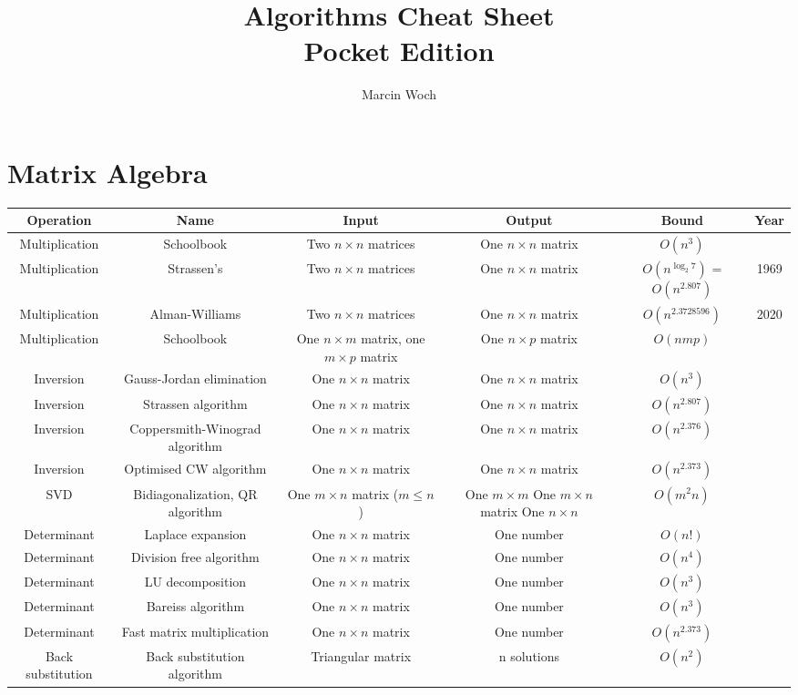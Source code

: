 \documentclass{article}
\author{Marcin Woch}
\title{Algorithms Cheat Sheet \\
\large Pocket Edition\\}
\date{}
\begin{document}
\maketitle

\newpage
\section*{Matrix Algebra}

\begin{table}[ht]
	\centering
	\begin{tabular}{c ccccc}
		Operation & Name & Input & Output & Bound & Year\\
		\hline
		Multiplication & Schoolbook & Two $n \times n$ matrices & One $n\times n$ matrix & $O(n^3)$ &\\
		Multiplication &Strassen's & Two $n \times n$  matrices & One $n\times n$ matrix &$O(n^{\log_2{7}})$ = $O(n^{2.807})$ & 1969\\
	    Multiplication &Alman-Williams & Two $n \times n$  matrices & One $n\times n$ matrix& $O(n^{2.3728596})$ & 2020\\
		Multiplication &Schoolbook & One $n\times m$ matrix, one $m\times p$ matrix & One $n\times p$ matrix& $O(nmp)$ & \\
		Inversion &Gauss-Jordan elimination & One $n\times n$ matrix & One $n\times n$ matrix& $O(n^3)$ & \\
		Inversion &Strassen algorithm & One $n\times n$ matrix & One $n\times n$ matrix& $O(n^{2.807})$ & \\
		Inversion &Coppersmith-Winograd algorithm & One $n\times n$ matrix & One $n\times n$ matrix& $O(n^{2.376})$ & \\
		Inversion &Optimised CW algorithm & One $n\times n$ matrix & One $n\times n$ matrix& $O(n^{2.373})$ & \\
		SVD &Bidiagonalization, QR algorithm & One $m\times n$ matrix ($m\leq n$)& \makecell {One $m\times m$ \\ One $m \times n$ matrix \\ One $n \times n$} & $O(m^2n)$ & \\
		Determinant &Laplace expansion & One $n\times n$ matrix & One number & $O(n!)$ & \\
		Determinant & Division free algorithm & One $n\times n$ matrix & One number & $O(n^4)$ & \\
		Determinant & LU decomposition & One $n\times n$ matrix & One number & $O(n^3)$ & \\
		Determinant & Bareiss algorithm & One $n\times n$ matrix & One number & $O(n^3)$ & \\
		Determinant & Fast matrix multiplication & One $n\times n$ matrix & One number & $O(n^{2.373})$ & \\
		Back substitution & Back substitution algorithm & Triangular matrix & n solutions & $O(n^2)$ & \\
		\hline
	\end{tabular}
\end{table}
\end{document}
